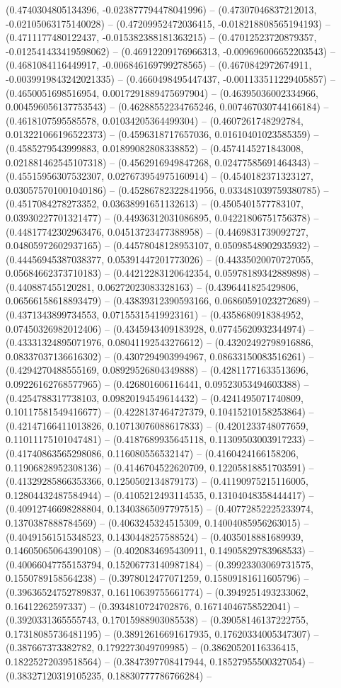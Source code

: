 (0.4740304805134396, -0.023877794478041996) -- (0.47307046837212013, -0.02105063175140028) -- (0.47209952472036415, -0.018218808565194193) -- (0.4711177480122437, -0.015382388181363215) -- (0.47012523720879357, -0.012541433419598062) -- (0.46912209176966313, -0.009696006652203543) -- (0.4681084116449917, -0.006846169799278565) -- (0.4670842972674911, -0.0039919843242021335) -- (0.4660498495447437, -0.001133511229405857) -- (0.4650051698516954, 0.0017291889475697904) -- (0.46395036002334966, 0.004596056137753543) -- (0.46288552234765246, 0.007467030744166184) -- (0.4618107595585578, 0.01034205364499304) -- (0.4607261748292784, 0.013221066196522373) -- (0.4596318717657036, 0.01610401023585359) -- (0.4585279543999883, 0.01899082808338852) -- (0.4574145271843008, 0.021881462545107318) -- (0.4562916949847268, 0.02477585691464343) -- (0.45515956307532307, 0.027673954975160914) -- (0.4540182371323127, 0.030575701001040186) -- (0.45286782322841956, 0.033481039759380785) -- (0.4517084278273352, 0.03638991651132613) -- (0.4505401577783107, 0.03930227701321477) -- (0.44936312031086895, 0.04221806751756378) -- (0.44817742302963476, 0.04513723477388958) -- (0.4469831739092727, 0.04805972602937165) -- (0.44578048128953107, 0.05098548902935932) -- (0.44456945387038377, 0.05391447201773026) -- (0.44335020070727055, 0.05684662373710183) -- (0.44212283120642354, 0.05978189342889898) -- (0.440887455120281, 0.06272023083328163) -- (0.4396441825429806, 0.06566158618893479) -- (0.43839312390593166, 0.06860591023272689) -- (0.4371343899734553, 0.07155315419923161) -- (0.4358680918384952, 0.07450326982012406) -- (0.4345943409183928, 0.07745620932344974) -- (0.43331324895071976, 0.08041192543276612) -- (0.43202492798916886, 0.08337037136616302) -- (0.4307294903994967, 0.08633150083516261) -- (0.4294270488555169, 0.08929526804349888) -- (0.42811771633513696, 0.09226162768577965) -- (0.426801606116441, 0.09523053494603388) -- (0.4254788317738103, 0.09820194549614432) -- (0.4241495071740809, 0.10117581549416677) -- (0.4228137464727379, 0.10415210158253864) -- (0.42147166411013826, 0.10713076088617833) -- (0.4201233748077659, 0.11011175101047481) -- (0.4187689935645118, 0.11309503003917233) -- (0.41740863565298086, 0.116080556532147) -- (0.4160424166158206, 0.11906828952308136) -- (0.4146704522620709, 0.12205818851703591) -- (0.41329285866353366, 0.1250502134879173) -- (0.41190975215116005, 0.12804432487584944) -- (0.4105212493114535, 0.13104048358444417) -- (0.40912746698288804, 0.13403865097797515) -- (0.40772852225233974, 0.1370387888784569) -- (0.4063245324515309, 0.14004085956263015) -- (0.40491561515348523, 0.1430448257588524) -- (0.4035018881689939, 0.14605065064390108) -- (0.4020834695430911, 0.14905829783968533) -- (0.40066047755153794, 0.15206773140987184) -- (0.39923303069731575, 0.1550789158564238) -- (0.3978012477071259, 0.15809181611605796) -- (0.39636524752789837, 0.16110639755661774) -- (0.3949251493233062, 0.16412262597337) -- (0.3934810724702876, 0.16714046758522041) -- (0.3920331365555743, 0.17015988903085538) -- (0.39058146137222755, 0.17318085736481195) -- (0.38912616691617935, 0.17620334005347307) -- (0.387667373382782, 0.1792273049709985) -- (0.38620520116336415, 0.18225272039518564) -- (0.3847397708417944, 0.18527955500327054) -- (0.38327120319105235, 0.18830777786766284) -- 